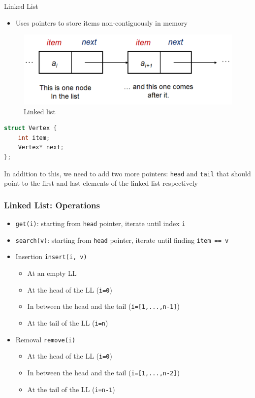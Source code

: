 \documentclass{beamer}
\begin{document}
\begin{frame}[fragile]{Linked List}
    \begin{itemize}
        \item Uses pointers to store items non-contiguously in memory
    \end{itemize}
    \begin{figure}[H]
        \centering
        \includegraphics[scale=0.28]{imgs/2-LDS/linked-list/linked-list.png}
        \caption{Linked list}
    \end{figure}
    
	\begin{lstlisting}[language=c++]
struct Vertex {
	int item;
	Vertex* next;
};
\end{lstlisting}
	In addition to this, we need to add two more pointers: \verb|head| and \verb|tail| that should point to the first and last elements of the linked list respectively
\end{frame}

\begin{frame}[fragile]
\frametitle{Linked List: Operations}
	\begin{itemize}
		\item \verb|get(i)|: starting from \verb|head| pointer, iterate until index \verb|i|
		\item \verb|search(v)|: starting from \verb|head| pointer, iterate until finding \verb|item == v|
		\item Insertion \verb|insert(i, v)|
			\begin{itemize}
				\item At an empty LL
				\item At the head of the LL (\verb|i=0|)
				\item In between the head and the tail (\verb|i=[1,...,n-1]|)
				\item At the tail of the LL (\verb|i=n|)
			\end{itemize}
		\item Removal \verb|remove(i)|
			\begin{itemize}
				\item At the head of the LL (\verb|i=0|)
				\item In between the head and the tail (\verb|i=[1,...,n-2]|)
				\item At the tail of the LL (\verb|i=n-1|)
			\end{itemize}
	\end{itemize}
\end{frame}
\end{document}
